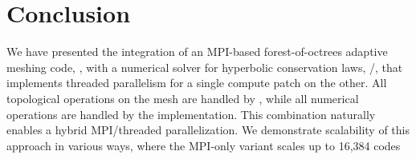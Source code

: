 

\section{Conclusion}

We have presented the integration of an MPI-based forest-of-octrees adaptive
meshing code, \pforest, with a numerical solver for hyperbolic
conservation laws, \clawpack/\manyclaw,
that implements threaded parallelism for a single compute patch
on the other.  All topological operations on the mesh are handled by \pforest,
while all numerical operations are handled by the \clawpack implementation.
This combination naturally enables a hybrid MPI/threaded parallelization.
We demonstrate scalability of this approach in various ways, where the MPI-only variant
scales up to 16,384 codes
